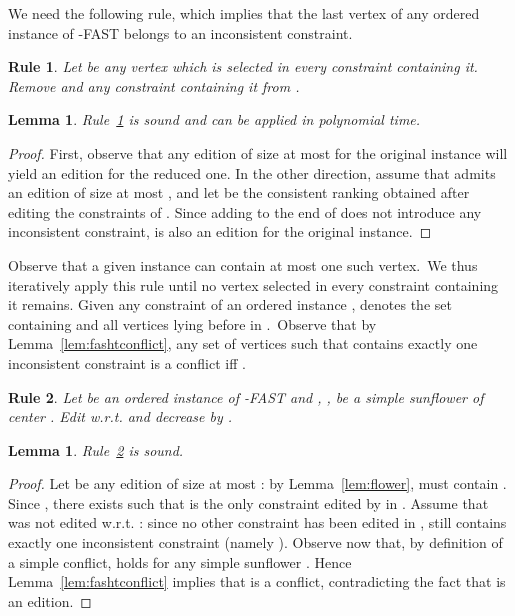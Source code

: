 \documentclass[11pt]{article}
\newtheorem{lemma}[theorem]{Lemma}
\newtheorem{polyrule}{Rule}[section]
\begin{document}
We need the following rule, 
which implies that the last vertex of any ordered instance of {\sc -FAST} belongs 
to an inconsistent constraint. 

\begin{polyrule}
\label{rule:uselessvertex}
	Let  be any vertex which is selected in every constraint containing it. Remove 
	 and any constraint containing it from . 
\end{polyrule}

\begin{lemma}
\label{lem:uselessvertex}
	Rule~\ref{rule:uselessvertex} is sound and can be applied in polynomial time.
\end{lemma}

\begin{proof}
	First, observe that any edition of size at most  for the original instance will yield an edition for the reduced one. In the other direction, assume that  admits an edition  of size at most , and let  be the consistent ranking obtained after editing the constraints of . Since adding  to the end of  does not introduce any inconsistent constraint,  is also an edition for the original instance.
 \end{proof}

Observe that a given instance can contain at most one such vertex.~We thus iteratively apply this rule until no vertex selected in every constraint containing it remains. 
Given any constraint  of an ordered instance ,  denotes the set containing  and all vertices lying before  in .~Observe that by Lemma~\ref{lem:fashtconflict}, any set  of  vertices such that  contains exactly one inconsistent constraint is a conflict iff . 

\begin{polyrule}
\label{rule:correctFASHT}
	Let  be an ordered instance of {\sc -FAST}  and , , 
	be a simple sunflower of center . Edit  w.r.t.  and decrease  by .

\end{polyrule}

\begin{lemma}
\label{lem:correctFASHT}
	Rule~\ref{rule:correctFASHT} is sound. 

\end{lemma}

\begin{proof}
	Let  be any edition of size at most : by Lemma~\ref{lem:flower},  must contain . Since , there exists  such that  is the only constraint edited by  in . Assume that  was not edited w.r.t. : since no other constraint has been edited in ,  still contains exactly one inconsistent constraint (namely ). Observe now that, by definition of a simple conflict,  holds for any simple sunflower . Hence Lemma~\ref{lem:fashtconflict} implies that  is 
	a conflict, contradicting the fact that  is an edition. 
 \end{proof}
\end{document}
